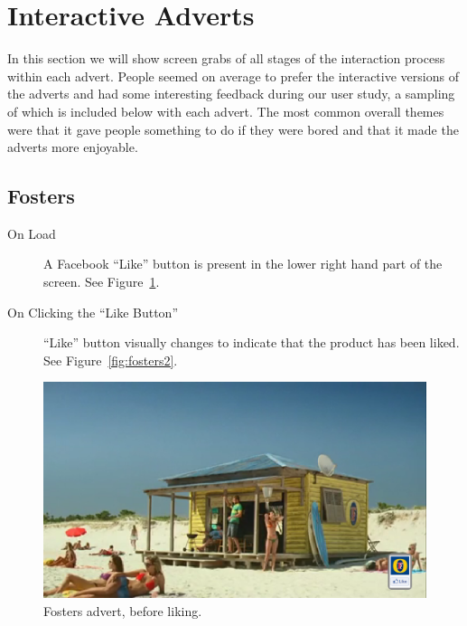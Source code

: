 \section{Interactive Adverts}
\label{sec:appendix_ads}
In this section we will show screen grabs of all stages of the interaction process within each advert. People seemed on average to prefer the interactive versions of the adverts and had some interesting feedback during our user study, a sampling of which is included below with each advert. The most common overall themes were that it gave people something to do if they were bored and that it made the adverts more enjoyable.

\subsection{Fosters}
	\begin{description}
		\item[On Load]{A Facebook ``Like'' button is present in the lower right hand part of the screen. See Figure~\ref{fig:fosters1}.}
		\item[On Clicking the ``Like Button'']{``Like'' button visually changes to indicate that the product has been liked. See Figure~\ref{fig:fosters2}.}
	\end{description}

	\begin{figure}[th]
		\centering
		\includegraphics[width=\textwidth,height=0.5\textheight,keepaspectratio]{images/adverts/fosters-1.png}
		\caption{Fosters advert, before liking.}
		\label{fig:fosters1}
	\end{figure}

